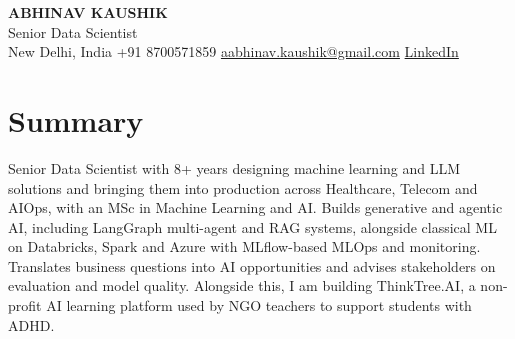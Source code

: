 \documentclass[10pt,a4paper]{article}
\begin{document}
\begin{center}
  {\LARGE\bfseries ABHINAV KAUSHIK}\\[2pt]
  {\large Senior Data Scientist}\\[2pt]
  New Delhi, India \textbar{} +91 8700571859 \textbar{} \href{mailto:aabhinav.kaushik@gmail.com}{aabhinav.kaushik@gmail.com} \textbar{} \href{https://www.linkedin.com/in/abhinav-kaushik10/}{LinkedIn}  
\end{center}

\section{Summary}
Senior Data Scientist with 8+ years designing machine learning and LLM solutions and bringing them into production across Healthcare, Telecom and AIOps, with an MSc in Machine Learning and AI. Builds generative and agentic AI, including LangGraph multi-agent and RAG systems, alongside classical ML on Databricks, Spark and Azure with MLflow-based MLOps and monitoring. Translates business questions into AI opportunities and advises stakeholders on evaluation and model quality. Alongside this, I am building ThinkTree.AI, a non-profit AI learning platform used by NGO teachers to support students with ADHD.
\end{document}
